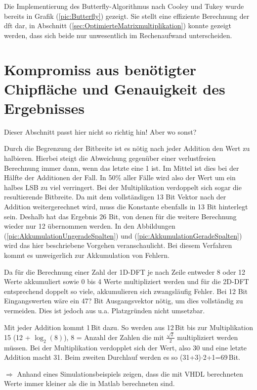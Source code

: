 Die Implementierung des Butterfly-Algorithmus nach Cooley und Tukey wurde bereits in Grafik (\ref{pic:Butterfly}) gezeigt. Sie stellt eine effiziente Berechnung der \gls{dft} dar, in 
Abschnitt (\ref{sec:OptimierteMatrixmultiplikation}) konnte gezeigt werden, dass sich beide nur unwesentlich im Rechenaufwand unterscheiden.


\section{Kompromiss aus benötigter Chipfläche und Genauigkeit des Ergebnisses}
Dieser Abschnitt passt hier nicht so richtig hin! Aber wo sonst?

Durch die Begrenzung der Bitbreite ist es nötig nach jeder Addition den Wert zu halbieren. Hierbei steigt die Abweichung gegenüber einer verlustfreien Berechnung immer dann, 
wenn das letzte eine 1 ist. Im Mittel ist dies bei der Hälfte der Additionen der Fall. In 50$\%$ aller Fälle wird also der Wert um ein halbes LSB zu viel verringert.
Bei der Multiplikation verdoppelt sich sogar die resultierende Bitbreite. Da mit dem vollständigen 13 Bit Vektor nach der Addition weitergerechnet wird, muss die Konstante
ebenfalls in 13 Bit hinterlegt sein. Deshalb hat das Ergebnis 26 Bit, von denen für die weitere Berechnung wieder nur 12 übernommen werden. In den Abbildungen 
(\ref{pic:AkkumulationUngeradeSpalten}) und (\ref{pic:AkkumulationGeradeSpalten}) wird das hier beschriebene Vorgehen veranschaulicht. Bei diesem Verfahren
kommt es unweigerlich zur Akkumulation von Fehlern.
 
Da für die Berechnung einer Zahl der 1D-DFT je nach Zeile entweder 8 oder 12 Werte akkumuliert sowie 0 bis 4 Werte multipliziert werden und für die 2D-DFT entsprechend doppelt 
so viele, akkumulieren sich zwangsläufig Fehler. Bei 12 Bit Eingangswerten wäre ein 47? Bit Ausgangsvektor nötig, um dies vollständig zu vermeiden. Dies ist jedoch aus u.a.
Platzgründen nicht umsetzbar.

Mit jeder Addition kommt 1\,Bit dazu. So werden aus 12\,Bit bis zur Multiplikation 15 (12 + $\log_2(8)$), 8 = Anzahl der Zahlen die mit $\tfrac{\sqrt{2}}{2}$ multipliziert
werden müssen. Bei der Multiplikation verdopplet sich der Wert, also 30 und eine letzte Addition macht 31.
Beim zweiten Durchlauf werden es so (31+3)$\cdot$2+1=69\,Bit.

$\Rightarrow$ Anhand eines Simulationsbeispiels zeigen, dass die mit VHDL berechneten Werte immer kleiner als die in Matlab berechneten sind.
